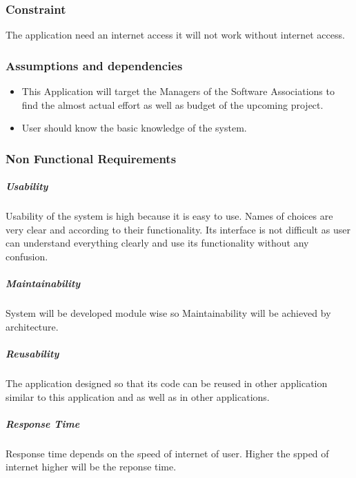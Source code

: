     \subsubsection{Constraint}
    The application need an internet access it will not work without internet access.
    \subsubsection{Assumptions and dependencies}
    \begin{center}
        \begin{itemize}
            \item This Application will target the Managers of the Software Associations to find the almost actual effort as well as budget of the upcoming project.
            \item User should know the basic knowledge of the system.
        \end{itemize}
    \end{center}
\subsubsection{Non Functional Requirements}
\subparagraph{Usability}
Usability of the system is high because it is easy to use. Names of choices are very clear and according to their functionality. Its interface is not difficult as user can understand
everything clearly and use its functionality without any confusion.  
\subparagraph{Maintainability}
System will be developed module wise so Maintainability will be achieved by architecture.
\subparagraph{Reusability}
The application designed so that its code can be reused in other application similar to this application and as well as in other applications.
\subparagraph{Response Time}
Response time depends on the speed of internet of user. Higher the spped of internet higher will be the reponse time.